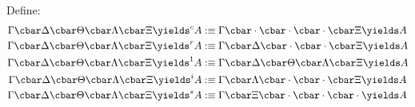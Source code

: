 \documentclass[a4paper,12pt]{article}
\begin{document}
Define:
\begin{align*}
    \Gamma \cbar \Delta \cbar \Theta \cbar \Lambda \cbar \Xi \yields^c A &:\equiv \Gamma \cbar \cdot \cbar \cdot \cbar \cdot \cbar \Xi \yields A \\
    \Gamma \cbar \Delta \cbar \Theta \cbar \Lambda \cbar \Xi \yields^r A &:\equiv \Gamma \cbar \Delta \cbar \cdot \cbar \cdot \cbar \Xi \yields A \\
    \Gamma \cbar \Delta \cbar \Theta \cbar \Lambda \cbar \Xi \yields^1 A &:\equiv \Gamma \cbar \Delta \cbar \Theta \cbar \Lambda \cbar \Xi \yields A \\
    \Gamma \cbar \Delta \cbar \Theta \cbar \Lambda \cbar \Xi \yields^i A &:\equiv \Gamma \cbar \Lambda \cbar \cdot \cbar \cdot \cbar \Xi \yields A \\
    \Gamma \cbar \Delta \cbar \Theta \cbar \Lambda \cbar \Xi \yields^s A &:\equiv \Gamma \cbar \Xi \cbar \cdot \cbar \cdot \cbar \cdot \yields A 
\end{align*}
\end{document}

